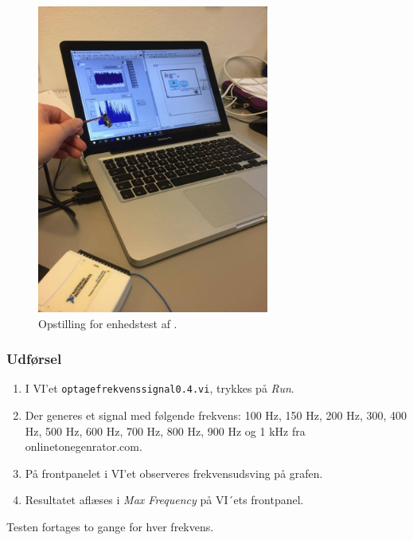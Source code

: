 		\begin{figure}
			\centering
			\includegraphics[width=3in]{elektrettoop.jpg}
			\caption{Opstilling for enhedstest af \elektretto.}
			\label{fig:elektrettoop}
		\end{figure}
	
		\subsubsection{Udførsel}
			\begin{enumerate}
				\item I VI'et \texttt{optagefrekvenssignal0.4.vi}, trykkes på \textit{Run}.  
				\item Der generes et signal med følgende frekvens: 100 Hz, 150 Hz, 200 Hz, 300, 400 Hz, 500 Hz, 600 Hz, 700 Hz, 800 Hz, 900 Hz og 1 kHz fra onlinetonegenrator.com.
				\item På frontpanelet i VI'et observeres frekvensudsving på grafen.   
				\item Resultatet aflæses i \textit{Max Frequency} på VI´ets frontpanel.
			\end{enumerate}
			
			Testen fortages to gange for hver frekvens.  
		
